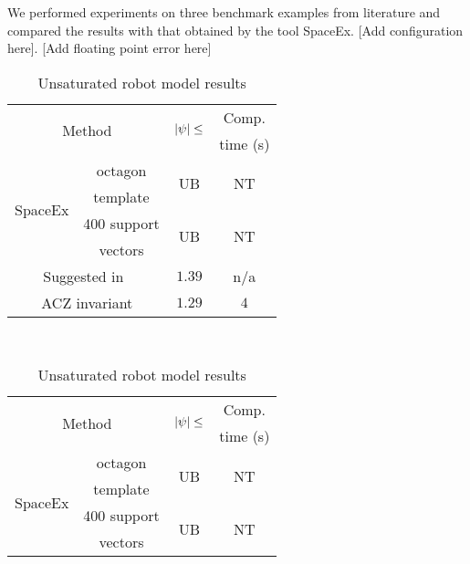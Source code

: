 We performed experiments on three benchmark examples from literature
and compared the results with that obtained by the tool SpaceEx. [Add
  configuration here]. [Add floating point error here]
\begin{table}
\begin{minipage}{0.48\textwidth}
\centering
\begin{tabular}{|l|c|c|c|}
\hline
\multicolumn{2}{|c|}{\multirow{2}{*}{Method}} &
\multirow{2}{*}{$\left|\psi\right|\leq$} & Comp.\\
\multicolumn{2}{|c|}{} & & time (s)\\
\hline
\multirow{4}{*}{SpaceEx} & octagon & \multirow{2}{*}{UB} & \multirow{2}{*}{NT}\\
& template & & \\
\cline{2-4}
& 400 support & \multirow{2}{*}{UB} & \multirow{2}{*}{NT}\\
& vectors & &\\
\hline
\multicolumn{2}{|c|}{\multirow{2}{*}{Suggested in~\cite{TODO}}} &
\multirow{2}{*}{$1.39$} & \multirow{2}{*}{n/a}\\
\multicolumn{2}{|c|}{} & &\\
\hline
\multicolumn{2}{|c|}{\multirow{2}{*}{ACZ invariant}} & \multirow{2}{*}{$1.29$} &
\multirow{2}{*}{$4$}\\
\multicolumn{2}{|c|}{} & & \\
\hline
\end{tabular}
\caption{Unsaturated robot model results}
~\label{tab:robot-unsaturated}
\end{minipage}
\hspace{0em}
\begin{minipage}{0.48\textwidth}
\centering
\begin{tabular}{|l|c|c|c|}
\hline
\multicolumn{2}{|c|}{\multirow{2}{*}{Method}} &
\multirow{2}{*}{$\left|\psi\right|\leq$} & Comp.\\
\multicolumn{2}{|c|}{} & & time (s)\\
\hline
\multirow{4}{*}{SpaceEx} & octagon & \multirow{2}{*}{UB} &
\multirow{2}{*}{NT}\\
& template & & \\
\cline{2-4}
& 400 support & \multirow{2}{*}{UB} & \multirow{2}{*}{NT}\\
& vectors & & \\

\end{tabular}
\end{minipage}
\end{table}
